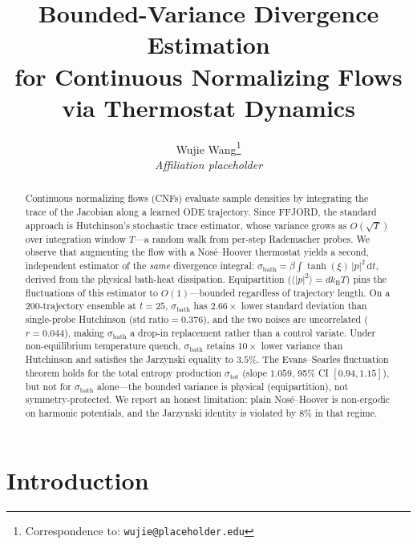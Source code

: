 \documentclass[11pt]{article}
\title{Bounded-Variance Divergence Estimation\\
for Continuous Normalizing Flows\\
via Thermostat Dynamics}
\author{
  Wujie Wang\thanks{Correspondence to: \texttt{wujie@placeholder.edu}}\\
  \textit{Affiliation placeholder}
}
\date{}
\newcommand{\dd}{\mathrm{d}}
\newcommand{\kT}{k_{\mathrm{B}}T}
\newcommand{\sbath}{\sigma_{\mathrm{bath}}}
\newcommand{\stot}{\sigma_{\mathrm{tot}}}
\begin{document}
\maketitle

\begin{abstract}
Continuous normalizing flows (CNFs) evaluate sample densities by integrating
the trace of the Jacobian along a learned ODE trajectory. Since FFJORD, the
standard approach is Hutchinson's stochastic trace estimator, whose variance
grows as $O(\sqrt{T})$ over integration window $T$---a random walk from
per-step Rademacher probes. We observe that augmenting the flow with a
Nos\'{e}--Hoover thermostat yields a second, independent estimator of the
\emph{same} divergence integral: $\sbath = \beta \int \tanh(\xi)\,|p|^2\,\dd t$,
derived from the physical bath-heat dissipation. Equipartition
($\langle |p|^2 \rangle = d\kT$) pins the fluctuations of this estimator to
$O(1)$---bounded regardless of trajectory length. On a 200-trajectory ensemble
at $t{=}25$, $\sbath$ has $2.66\times$ lower standard deviation than
single-probe Hutchinson ($\text{std ratio} = 0.376$), and the two noises are
uncorrelated ($r = 0.044$), making $\sbath$ a drop-in replacement rather than
a control variate. Under non-equilibrium temperature quench, $\sbath$ retains
$10\times$ lower variance than Hutchinson and satisfies the Jarzynski equality
to $3.5\%$. The Evans--Searles fluctuation theorem holds for the total entropy
production $\stot$ (slope $1.059$, 95\% CI $[0.94, 1.15]$), but not for
$\sbath$ alone---the bounded variance is physical (equipartition), not
symmetry-protected. We report an honest limitation: plain Nos\'{e}--Hoover is
non-ergodic on harmonic potentials, and the Jarzynski identity is violated by
$8\%$ in that regime.
\end{abstract}

\section{Introduction}
\label{sec:intro}
\end{document}
